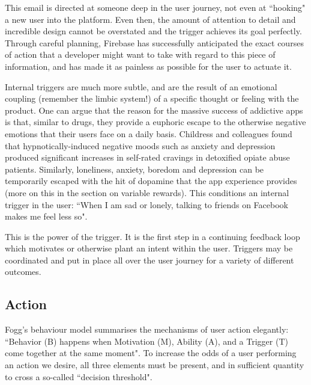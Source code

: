 This email is directed at someone deep in the user journey, not even at ``hooking" a new user into the platform. Even then, the amount of attention to detail and incredible design cannot be overstated and the trigger achieves its goal perfectly. Through careful planning, Firebase has successfully anticipated the exact courses of action that a developer might want to take with regard to this piece of information, and has made it as painless as possible for the user to actuate it.

Internal triggers are much more subtle, and are the result of an emotional coupling (remember the limbic system!) of a specific thought or feeling with the product. One can argue that the reason for the massive success of addictive apps is that, similar to drugs, they provide a euphoric escape to the otherwise negative emotions that their users face on a daily basis. Childress and colleagues \cite{childress1994can} found that hypnotically-induced negative moods such as anxiety and depression produced significant increases in self-rated cravings in detoxified opiate abuse patients. Similarly, loneliness, anxiety, boredom and depression can be temporarily escaped with the hit of dopamine that the app experience provides (more on this in the section on variable rewards). This conditions an internal trigger in the user: ``When I am sad or lonely, talking to friends on Facebook makes me feel less so".

This is the power of the trigger. It is the first step in a continuing feedback loop which motivates or otherwise plant an intent within the user. Triggers may be coordinated and put in place all over the user journey for a variety of different outcomes.

\subsection{Action}
Fogg's behaviour model \cite{fogg2009behavior} summarises the mechanisms of user action elegantly: ``Behavior (B) happens when Motivation (M), Ability (A), and a Trigger (T) come together at the same moment". To increase the odds of a user performing an action we desire, all three elements must be present, and in sufficient quantity to cross a so-called ``decision threshold".

